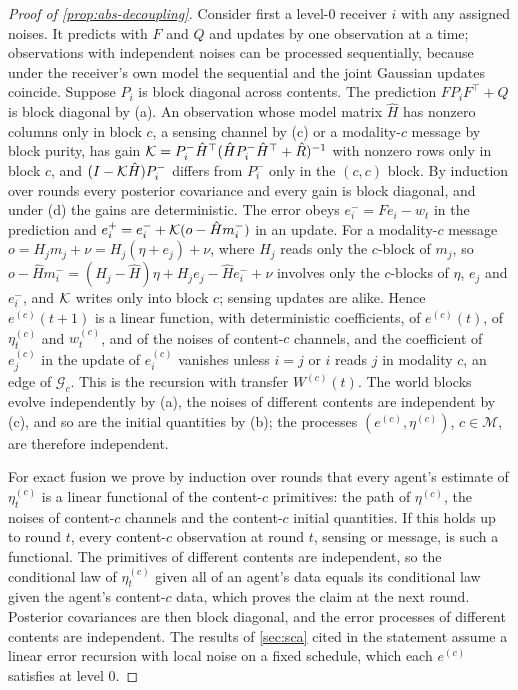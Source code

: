\begin{proof}[Proof of \cref{prop:abs-decoupling}]
Consider first a level-0 receiver $i$ with any assigned noises. It predicts with $F$ and $Q$ and updates by one observation at a time; observations with independent noises can be processed sequentially, because under the receiver's own model the sequential and the joint Gaussian updates coincide. Suppose $P_i$ is block diagonal across contents. The prediction $FP_iF^\top+Q$ is block diagonal by (a). An observation whose model matrix $\hat H$ has nonzero columns only in block $c$, a sensing channel by (c) or a modality-$c$ message by block purity, has gain $\mathcal{K}=P^-_i\hat H^\top(\hat HP^-_i\hat H^\top+\hat R)^{-1}$ with nonzero rows only in block $c$, and $(I-\mathcal{K}\hat H)P^-_i$ differs from $P^-_i$ only in the $(c,c)$ block. By induction over rounds every posterior covariance and every gain is block diagonal, and under (d) the gains are deterministic. The error obeys $e^-_i=Fe_i-w_t$ in the prediction and $e^+_i=e^-_i+\mathcal{K}(o-\hat Hm^-_i)$ in an update. For a modality-$c$ message $o=H_jm_j+\nu=H_j(\eta+e_j)+\nu$, where $H_j$ reads only the $c$-block of $m_j$, so $o-\hat Hm^-_i=(H_j-\hat H)\eta+H_je_j-\hat He^-_i+\nu$ involves only the $c$-blocks of $\eta$, $e_j$ and $e^-_i$, and $\mathcal{K}$ writes only into block $c$; sensing updates are alike. Hence $e^{(c)}(t+1)$ is a linear function, with deterministic coefficients, of $e^{(c)}(t)$, of $\eta^{(c)}_t$ and $w^{(c)}_t$, and of the noises of content-$c$ channels, and the coefficient of $e^{(c)}_j$ in the update of $e^{(c)}_i$ vanishes unless $i=j$ or $i$ reads $j$ in modality $c$, an edge of $\mathcal G_c$. This is the recursion with transfer $W^{(c)}(t)$. The world blocks evolve independently by (a), the noises of different contents are independent by (c), and so are the initial quantities by (b); the processes $(e^{(c)},\eta^{(c)})$, $c\in\mathcal M$, are therefore independent.

For exact fusion we prove by induction over rounds that every agent's estimate of $\eta^{(c)}_t$ is a linear functional of the content-$c$ primitives: the path of $\eta^{(c)}$, the noises of content-$c$ channels and the content-$c$ initial quantities. If this holds up to round $t$, every content-$c$ observation at round $t$, sensing or message, is such a functional. The primitives of different contents are independent, so the conditional law of $\eta^{(c)}_t$ given all of an agent's data equals its conditional law given the agent's content-$c$ data, which proves the claim at the next round. Posterior covariances are then block diagonal, and the error processes of different contents are independent. The results of \cref{sec:sca} cited in the statement assume a linear error recursion with local noise on a fixed schedule, which each $e^{(c)}$ satisfies at level 0.
\end{proof}

